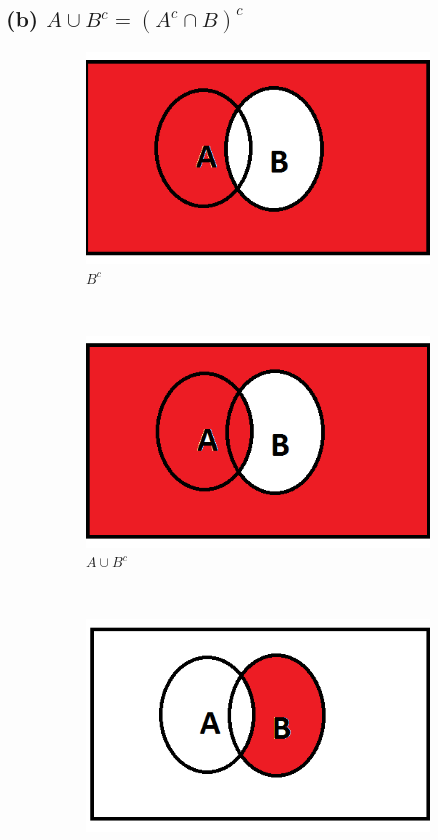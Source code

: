 \documentclass[a4paper,11pt]{report}
\begin{document}
\subsection*{(b) $A \cup B^c = (A^c\cap B)^c$}
\begin{figure}[hb]
  \centering
    \begin{subfigure}[b]{0.25\textwidth}
        \includegraphics[width=\textwidth]{BC}
        \caption{$B^c$}
    \end{subfigure}
 ~
    \begin{subfigure}[b]{0.25\textwidth}
        \includegraphics[width=\textwidth]{AuBc}
        \caption{$A \cup B^c$}
    \end{subfigure}
 ~
    \begin{subfigure}[b]{0.25\textwidth}
        \includegraphics[width=\textwidth]{AcnB}

\end{subfigure}
\end{figure}
\end{document}
